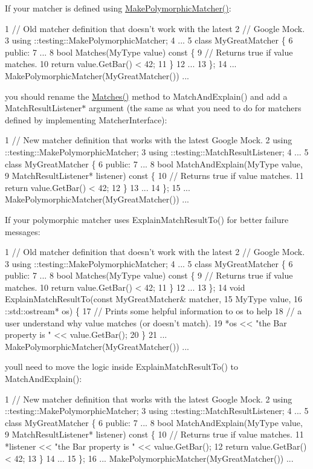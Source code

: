 If your matcher is defined using {\ttfamily \hyperlink{namespacetesting_a667ca94f190ec2e17ee2fbfdb7d3da04}{Make\+Polymorphic\+Matcher()}}\+: 
\begin{DoxyCode}
1 // Old matcher definition that doesn't work with the latest
2 // Google Mock.
3 using ::testing::MakePolymorphicMatcher;
4 ...
5 class MyGreatMatcher \{
6  public:
7   ...
8   bool Matches(MyType value) const \{
9     // Returns true if value matches.
10     return value.GetBar() < 42;
11   \}
12   ...
13 \};
14 ... MakePolymorphicMatcher(MyGreatMatcher()) ...
\end{DoxyCode}


you should rename the {\ttfamily \hyperlink{namespacetesting_ad53b509ae9cd51040d67f668f99702ae}{Matches()}} method to {\ttfamily Match\+And\+Explain()} and add a {\ttfamily Match\+Result\+Listener$\ast$} argument (the same as what you need to do for matchers defined by implementing {\ttfamily Matcher\+Interface})\+: 
\begin{DoxyCode}
1 // New matcher definition that works with the latest Google Mock.
2 using ::testing::MakePolymorphicMatcher;
3 using ::testing::MatchResultListener;
4 ...
5 class MyGreatMatcher \{
6  public:
7   ...
8   bool MatchAndExplain(MyType value,
9                        MatchResultListener* listener) const \{
10     // Returns true if value matches.
11     return value.GetBar() < 42;
12   \}
13   ...
14 \};
15 ... MakePolymorphicMatcher(MyGreatMatcher()) ...
\end{DoxyCode}


If your polymorphic matcher uses {\ttfamily Explain\+Match\+Result\+To()} for better failure messages\+: 
\begin{DoxyCode}
1 // Old matcher definition that doesn't work with the latest
2 // Google Mock.
3 using ::testing::MakePolymorphicMatcher;
4 ...
5 class MyGreatMatcher \{
6  public:
7   ...
8   bool Matches(MyType value) const \{
9     // Returns true if value matches.
10     return value.GetBar() < 42;
11   \}
12   ...
13 \};
14 void ExplainMatchResultTo(const MyGreatMatcher& matcher,
15                           MyType value,
16                           ::std::ostream* os) \{
17   // Prints some helpful information to os to help
18   // a user understand why value matches (or doesn't match).
19   *os << "the Bar property is " << value.GetBar();
20 \}
21 ... MakePolymorphicMatcher(MyGreatMatcher()) ...
\end{DoxyCode}


you\textquotesingle{}ll need to move the logic inside {\ttfamily Explain\+Match\+Result\+To()} to {\ttfamily Match\+And\+Explain()}\+: 
\begin{DoxyCode}
1 // New matcher definition that works with the latest Google Mock.
2 using ::testing::MakePolymorphicMatcher;
3 using ::testing::MatchResultListener;
4 ...
5 class MyGreatMatcher \{
6  public:
7   ...
8   bool MatchAndExplain(MyType value,
9                        MatchResultListener* listener) const \{
10     // Returns true if value matches.
11     *listener << "the Bar property is " << value.GetBar();
12     return value.GetBar() < 42;
13   \}
14   ...
15 \};
16 ... MakePolymorphicMatcher(MyGreatMatcher()) ...
\end{DoxyCode}


